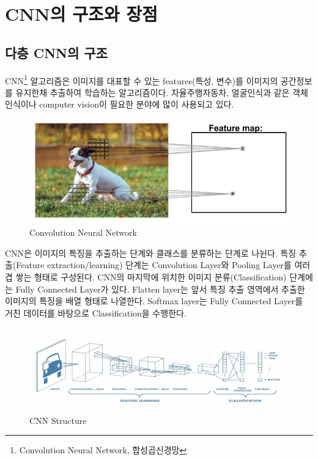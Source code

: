 \section{CNN의 구조와 장점}
\subsection{다층 CNN의 구조}
    CNN\footnote{Convolution Neural Network, 합성곱신경망} 알고리즘은 이미지를 대표할 수 있는 features(특성, 변수)를 이미지의 공간정보를 유지한채 추출하여 학습하는 알고리즘이다. 자율주행자동차, 얼굴인식과 같은 객체인식이나 computer vision이 필요한 분야에 많이 사용되고 있다. \\
    \vspace{-4mm}
    \begin{figure}[!h]\centering
		\includegraphics[width=.65\textwidth]{image/week04/2-1.png}
		\caption{\small Convolution Neural Network}
		\vspace{-10pt}
    \end{figure}
    
    CNN은 이미지의 특징을 추출하는 단계와 클래스를 분류하는 단계로 나뉜다. 특징 추출(Feature extraction/learning) 단계는 Convolution Layer와 Pooling Layer를 여러 겹 쌓는 형태로 구성된다. 
    CNN의 마지막에 위치한 이미지 분류(Classification) 단계에는 Fully Connected Layer가 있다. Flatten layer는 앞서 특징 추출 영역에서 추출한 이미지의 특징을 배열 형태로 나열한다. Softmax layer는 Fully Connected Layer를 거친 데이터를 바탕으로 Classification을 수행한다.
    \vspace{-4mm}
    \begin{figure}[!h]\centering
		\includegraphics[width=.65\textwidth]{image/week04/2-2.png}
		\caption{\small CNN Structure}
		\vspace{-10pt}
    \end{figure}
    

